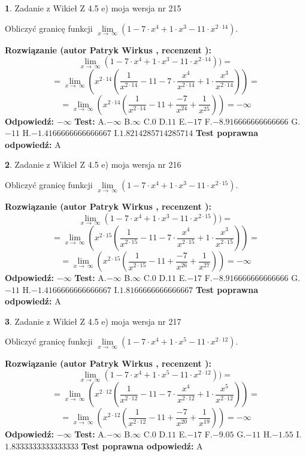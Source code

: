 \documentclass[12pt, a4paper]{article}
\theoremstyle{definition} %
\newtheorem{zad}{}
\newcommand{\zadStart}[1]{\begin{zad}#1\newline}
\newcommand{\zadStop}{\end{zad}}
\newcommand{\rozwStart}[2]{\noindent \textbf{Rozwiązanie (autor #1 , recenzent #2): }\newline}
\newcommand{\rozwStop}{\newline}
\newcommand{\odpStart}{\noindent \textbf{Odpowiedź:}\newline}
\newcommand{\odpStop}{\newline}
\newcommand{\testStart}{\noindent \textbf{Test:}\newline}
\newcommand{\testStop}{\newline}
\newcommand{\kluczStart}{\noindent \textbf{Test poprawna odpowiedź:}\newline}
\newcommand{\kluczStop}{\newline}
\begin{document}
\zadStart{Zadanie z Wikieł Z 4.5 e) moja wersja nr 215}


Obliczyć granicę funkcji  $\lim\limits_{x\to\ \infty}(1 - 7 \cdot x^{4}+1 \cdot x^{3}- 11 \cdot x^{2\cdot14})$.
\zadStop
\rozwStart{Patryk Wirkus}{}
$$\lim\limits_{x\to\ \infty}(1 - 7 \cdot x^{4}+1 \cdot x^{3}- 11 \cdot x^{2\cdot14}))=$$
$$=\lim\limits_{x\to\ \infty}(x^{2\cdot14}(\frac{1}{x^{2\cdot14}}-11 -7 \cdot \frac{x^{4}}{x^{2\cdot14}}+1 \cdot \frac{x^{3}}{x^{2\cdot14}}))=$$
$$=\lim\limits_{x\to\ \infty}(x^{2\cdot14}(\frac{1}{x^{2\cdot14}}-11 + \frac{-7}{x^{24}}+ \frac{1}{x^{25}}))=-\infty$$
\rozwStop
\odpStart
$-\infty$
\odpStop
\testStart
A.$-\infty$ B.$\infty$ C.$0$ D.$11$ E.$-17$
F.$-8.916666666666666$ G.$-11$
H.$-1.4166666666666667$
I.$1.8214285714285714$
\testStop
\kluczStart
A
\kluczStop



\zadStart{Zadanie z Wikieł Z 4.5 e) moja wersja nr 216}


Obliczyć granicę funkcji  $\lim\limits_{x\to\ \infty}(1 - 7 \cdot x^{4}+1 \cdot x^{3}- 11 \cdot x^{2\cdot15})$.
\zadStop
\rozwStart{Patryk Wirkus}{}
$$\lim\limits_{x\to\ \infty}(1 - 7 \cdot x^{4}+1 \cdot x^{3}- 11 \cdot x^{2\cdot15}))=$$
$$=\lim\limits_{x\to\ \infty}(x^{2\cdot15}(\frac{1}{x^{2\cdot15}}-11 -7 \cdot \frac{x^{4}}{x^{2\cdot15}}+1 \cdot \frac{x^{3}}{x^{2\cdot15}}))=$$
$$=\lim\limits_{x\to\ \infty}(x^{2\cdot15}(\frac{1}{x^{2\cdot15}}-11 + \frac{-7}{x^{26}}+ \frac{1}{x^{27}}))=-\infty$$
\rozwStop
\odpStart
$-\infty$
\odpStop
\testStart
A.$-\infty$ B.$\infty$ C.$0$ D.$11$ E.$-17$
F.$-8.916666666666666$ G.$-11$
H.$-1.4166666666666667$
I.$1.8166666666666667$
\testStop
\kluczStart
A
\kluczStop



\zadStart{Zadanie z Wikieł Z 4.5 e) moja wersja nr 217}


Obliczyć granicę funkcji  $\lim\limits_{x\to\ \infty}(1 - 7 \cdot x^{4}+1 \cdot x^{5}- 11 \cdot x^{2\cdot12})$.
\zadStop
\rozwStart{Patryk Wirkus}{}
$$\lim\limits_{x\to\ \infty}(1 - 7 \cdot x^{4}+1 \cdot x^{5}- 11 \cdot x^{2\cdot12}))=$$
$$=\lim\limits_{x\to\ \infty}(x^{2\cdot12}(\frac{1}{x^{2\cdot12}}-11 -7 \cdot \frac{x^{4}}{x^{2\cdot12}}+1 \cdot \frac{x^{5}}{x^{2\cdot12}}))=$$
$$=\lim\limits_{x\to\ \infty}(x^{2\cdot12}(\frac{1}{x^{2\cdot12}}-11 + \frac{-7}{x^{20}}+ \frac{1}{x^{19}}))=-\infty$$
\rozwStop
\odpStart
$-\infty$
\odpStop
\testStart
A.$-\infty$ B.$\infty$ C.$0$ D.$11$ E.$-17$
F.$-9.05$ G.$-11$
H.$-1.55$
I.$1.8333333333333333$
\testStop
\kluczStart
A
\kluczStop
\end{document}

